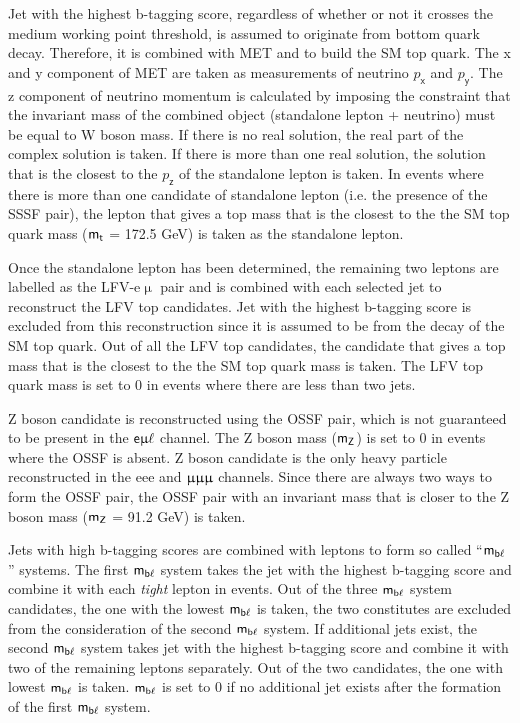 Jet with the highest b-tagging score, regardless of whether or not it crosses the medium working point threshold, is assumed to originate from bottom quark decay. Therefore, it is combined with \ac{MET} and  to build the \ac{SM} top quark. The x and y component of \ac{MET} are taken as measurements of neutrino $p_{\textsf{x}}$ and $p_{\textsf{y}}$. The z component of neutrino momentum is calculated by imposing the constraint that the invariant mass of the combined object (standalone lepton + neutrino) must be equal to W boson mass. If there is no real solution, the real part of the complex solution is taken. If there is more than one real solution, the solution that is the closest to the $p_{\textsf{z}}$ of the standalone lepton is taken. In events where there is more than one candidate of standalone lepton (i.e. the presence of the \ac{SSSF} pair), the lepton that gives a top mass that is the closest to the the \ac{SM} top quark mass ($\textsf{m}_{\textsf{t}}$ = 172.5 GeV) is taken as the standalone lepton.

Once the standalone lepton has been determined, the remaining two leptons are labelled as the LFV-e$\upmu$ pair and is combined with each selected jet to reconstruct the LFV top candidates. Jet with the highest b-tagging score is excluded from this reconstruction since it is assumed to be from the decay of the \ac{SM} top quark. Out of all the LFV top candidates, the candidate that gives a top mass that is the closest to the the \ac{SM} top quark mass is taken. The LFV top quark mass is set to 0 in events where there are less than two jets.

Z boson candidate is reconstructed using the \ac{OSSF} pair, which is not guaranteed to be present in the $\textsf{e}\upmu\ell$ channel. The Z boson mass ($\textsf{m}_{\textsf{Z}}$) is set to 0 in events where the \ac{OSSF} is absent. Z boson candidate is the only heavy particle reconstructed in the eee and $\upmu\upmu\upmu$ channels. Since there are always two ways to form the \ac{OSSF} pair, the \ac{OSSF} pair with an invariant mass that is closer to the Z boson mass ($\textsf{m}_{\textsf{Z}}$ = 91.2 GeV) is taken. 

Jets with high b-tagging scores are combined with leptons to form so called ``$\textsf{m}_{\textsf{b}\ell}$'' systems. The first $\textsf{m}_{\textsf{b}\ell}$ system takes the jet with the highest b-tagging score and combine it with each \emph{tight} lepton in events. Out of the three $\textsf{m}_{\textsf{b}\ell}$ system candidates, the one with the lowest $\textsf{m}_{\textsf{b}\ell}$ is taken, the two constitutes are excluded from the consideration of the second $\textsf{m}_{\textsf{b}\ell}$ system. If additional jets exist, the second $\textsf{m}_{\textsf{b}\ell}$ system takes jet with the highest b-tagging score and combine it with two of the remaining leptons separately. Out of the two candidates, the one with lowest $\textsf{m}_{\textsf{b}\ell}$ is taken. $\textsf{m}_{\textsf{b}\ell}$ is set to 0 if no additional jet exists after the formation of the first $\textsf{m}_{\textsf{b}\ell}$ system.